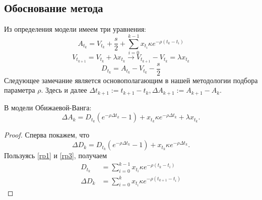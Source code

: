 \begin{appendices} %



	\section{Обоснование метода}

        Из определения модели имеем три уравнения:
        \begin{equation} \label{rp1}
                A_{t_k} = V_{t_k} + \frac{s}{2} + \sum _{i=0} ^{k-1} x_{t_i} \kappa e^{- \rho (t_k - t_i)}
        \end{equation}
        \begin{equation}\label{rp2}
                V_{t_{k+1}} = V_{t_k} + \lambda x_{t_k} \rightarrow V_{t_{k+1}} - V_{t_k} = \lambda x_{t_{k}}
        \end{equation}
        \begin{equation} \label{rp3}
                D_{t_k} = A_{t_k} - V_{t_k} - \frac{s}{2}
        \end{equation}
        Следующее замечание является основополагающим в нашей методологии подбора параметра $\rho$.
        Здесь и далее $\Delta t_{k+1} := t_{k+1} - t_k, \Delta A_{k+1} := A_{k+1} - A_k$.
        \begin{lemma} \label{mainregrOW}
                В модели Обижаевой-Ванга:
                \begin{equation*}
                        \Delta A_k = D_{t_k} (e^{- \rho \Delta t_k} - 1) + x_{t_k} \kappa e^{- \rho \Delta t_k} + \lambda x_{t_k} .
                \end{equation*}
        \end{lemma}
        \begin{proof}
                Сперва покажем, что 
                \begin{equation*} \label{DeltaDk}
                    \Delta D_{k} = D_{t_k} (e^{- \rho \Delta t_k} - 1) + x_{t_k} \kappa e^{- \rho \Delta t_k}.
                \end{equation*}
                Пользуясь \eqref{rp1} и \eqref{rp3}, получаем
                \begin{align*}
                        D_{t_k} &= \sum _{i=0} ^{k-1} x_{t_i} \kappa e^{- \rho (t_k - t_i)} \\
                        \Delta D_{k} &= \sum _{i=0} ^k x_{t_i} \kappa e^{- \rho (t_{k+1} - t_i)} 

\end{align*}
\end{proof}
\end{appendices}
